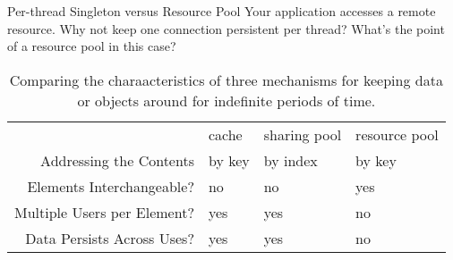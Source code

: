 \begin{example}{Per-thread Singleton versus Resource Pool}
Your application accesses a remote resource. Why not keep one connection
persistent per thread? What's the point of a resource pool in this case?
\end{example}



\begin{table}
	\centering
	\begin{tabular}{rlll} \toprule
            & cache             & sharing pool & resource pool 
    \\ \cmidrule{2-4}
    Addressing the Contents     & by key       & by index & by key
    \\
        Elements Interchangeable?   & no    & no    & yes
    \\
    Multiple Users per Element? & yes   & yes   & no
    \\
    Data Persists Across Uses?  & yes   & yes   & no
    \\ \bottomrule
    \end{tabular}
	\caption{Comparing the charaacteristics of three mechanisms for keeping data
	or objects around for indefinite periods of time.}
	\label{tab:three-deferred-deletions}
\end{table}







\begin{comment}

\begin{table}
\centering
\begin{tabular}{|l|l|} \hline
\em mechanism & \\ \hline \hline
resource pool & \\ \hline
cache & \\ \hline
sharing pool & (interning)\\ \hline
memoization & \\ \hline
backing store &(externalized memo) \\ \hline
non-OO & (column orientation) \\ \hline 
\end{tabular}
\caption{Lifetime management mechanisms not provided by the Java language that one must implement.}
\label{tab:software-lifetime-management}
\end{table}

\end{comment}